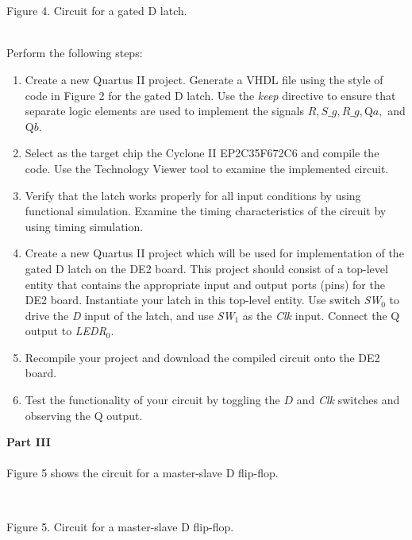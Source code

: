 \documentclass[epsfig,10pt,fullpage]{article}
\begin{document}
~\\
\begin{figure}[H]
\scriptsize
\centerline{
\hbox{}}
\end{figure}
~\\
\centerline{Figure 4.  Circuit for a gated D latch.}
~\\

\noindent
Perform the following steps:

\begin{enumerate}
\item Create a new Quartus II project. Generate a VHDL file using the style of code 
in Figure 2 for the gated D latch. Use the {\it keep} directive to ensure
that separate logic elements are used to implement the signals $R, S\_g, R\_g, $Q$a,$ and
Q$b$.
\item Select as the target chip the Cyclone II EP2C35F672C6 and compile the code. Use the 
Technology Viewer tool to examine the implemented circuit.
\item Verify that the latch works properly for all input conditions by using functional 
simulation. Examine the timing characteristics of the circuit by using timing simulation.
\item Create a new Quartus II project which will be used for implementation of the gated D
latch on the DE2 board. This project should consist of a top-level entity that 
contains the appropriate input and output ports (pins) for the DE2 board. Instantiate your
latch in this top-level entity. Use switch {\it SW}$_0$ to drive the {\it D} input of the latch,
and use {\it SW}$_1$ as the {\it Clk} input. Connect the Q output to {\it LEDR}$_{0}$.
\item
Recompile your project and download the compiled circuit onto the DE2 board.
\item
Test the functionality of your circuit by toggling the $D$ and {\it Clk} switches and observing 
the Q output.
\end{enumerate}

\noindent
{\bf Part III}
~\\
~\\
\noindent
Figure 5 shows the circuit for a master-slave D flip-flop.
~\\

\begin{figure}[H]
\scriptsize
\centerline{
\hbox{}}
\end{figure}
~\\
\centerline{Figure 5.  Circuit for a master-slave D flip-flop.}
\end{document}
